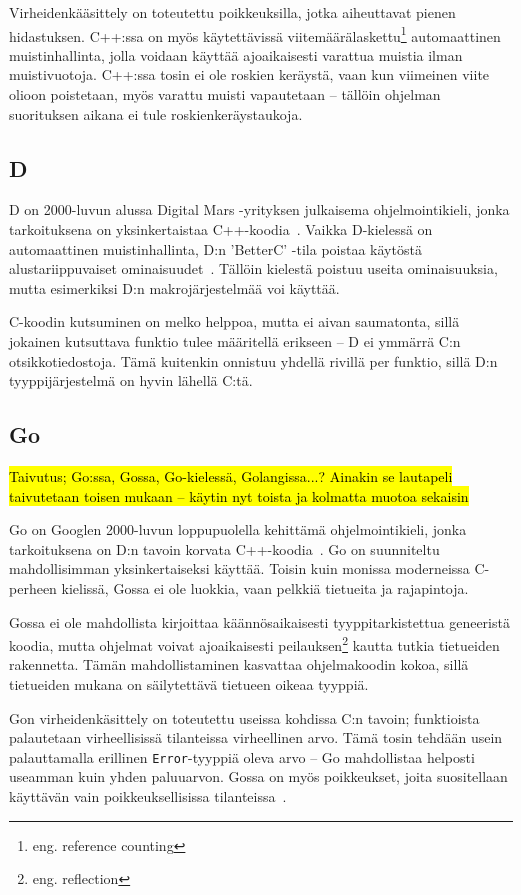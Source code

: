 Virheidenkääsittely on toteutettu poikkeuksilla, jotka aiheuttavat pienen
hidastuksen. C++:ssa on myös käytettävissä viitemäärälaskettu\footnote{eng.
reference counting} automaattinen muistinhallinta, jolla voidaan käyttää
ajoaikaisesti varattua muistia ilman muistivuotoja. C++:ssa tosin ei ole
roskien keräystä, vaan kun viimeinen viite olioon poistetaan, myös varattu
muisti vapautetaan -- tällöin ohjelman suorituksen aikana ei tule
roskienkeräystaukoja.

\subsection{D}

D on 2000-luvun alussa Digital Mars -yrityksen julkaisema ohjelmointikieli,
jonka tarkoituksena on yksinkertaistaa C++-koodia~\citationneeded. Vaikka
D-kielessä on automaattinen muistinhallinta, D:n 'BetterC' -tila poistaa
käytöstä alustariippuvaiset ominaisuudet~\citep{dbetterc}. Tällöin kielestä
poistuu useita ominaisuuksia, mutta esimerkiksi D:n makrojärjestelmää voi
käyttää.

C-koodin kutsuminen on melko helppoa, mutta ei aivan saumatonta, sillä jokainen
kutsuttava funktio tulee määritellä erikseen -- D ei ymmärrä C:n
otsikkotiedostoja. Tämä kuitenkin onnistuu yhdellä rivillä per funktio, sillä
D:n tyyppijärjestelmä on hyvin lähellä C:tä.

\subsection{Go}

\hl{Taivutus; Go:ssa, Gossa, Go-kielessä, Golangissa...? Ainakin se lautapeli
taivutetaan toisen mukaan -- käytin nyt toista ja kolmatta muotoa sekaisin}

Go on Googlen 2000-luvun loppupuolella kehittämä ohjelmointikieli, jonka
tarkoituksena on D:n tavoin korvata C++-koodia~\citationneeded. Go on
suunniteltu mahdollisimman yksinkertaiseksi käyttää. Toisin kuin monissa
moderneissa C-perheen kielissä, Gossa ei ole luokkia, vaan pelkkiä tietueita ja
rajapintoja.

Gossa ei ole mahdollista kirjoittaa käännösaikaisesti tyyppitarkistettua
geneeristä koodia, mutta ohjelmat voivat ajoaikaisesti peilauksen\footnote{eng.
reflection} kautta tutkia tietueiden rakennetta. Tämän mahdollistaminen
kasvattaa ohjelmakoodin kokoa, sillä tietueiden mukana on säilytettävä tietueen
oikeaa tyyppiä.

Gon virheidenkäsittely on toteutettu useissa kohdissa C:n tavoin; funktioista
palautetaan virheellisissä tilanteissa virheellinen arvo. Tämä tosin tehdään
usein palauttamalla erillinen \texttt{Error}-tyyppiä oleva arvo -- Go
mahdollistaa helposti useamman kuin yhden paluuarvon. Gossa on myös
poikkeukset, joita suositellaan käyttävän vain poikkeuksellisissa
tilanteissa~\citationneeded.

